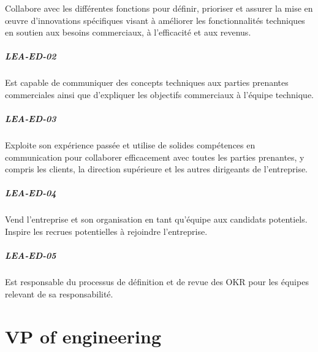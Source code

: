 \documentclass[a4paper, french, openany, 12pt]{book}
\newcommand\cha[1]{\textcolor{OliveGreen}{\textbf{\uppercase{lea-{#1}}}}}
\begin{document}
\begin{multicols}{2}
  Collabore avec les différentes fonctions pour définir, prioriser et assurer la mise en œuvre d'innovations spécifiques 
  visant à améliorer les fonctionnalités techniques en soutien aux besoins commerciaux, à l'efficacité et aux revenus.

  \paragraph*{\cha{ed-02}}

  Est capable de communiquer des concepts techniques aux parties prenantes commerciales ainsi que d'expliquer les 
  objectifs commerciaux à l'équipe technique.

  \paragraph*{\cha{ed-03}}

  Exploite son expérience passée et utilise de solides compétences en communication pour collaborer efficacement avec 
  toutes les parties prenantes, y compris les clients, la direction supérieure et les autres dirigeants de l'entreprise.

  \paragraph*{\cha{ed-04}}

  Vend l'entreprise et son organisation en tant qu'équipe aux candidats potentiels. 
  Inspire les recrues potentielles à rejoindre l'entreprise.

  \paragraph*{\cha{ed-05}}

  Est responsable du processus de définition et de revue des OKR pour les équipes relevant de sa responsabilité.

\end{multicols}

\chapter{VP of engineering}
\end{document}

